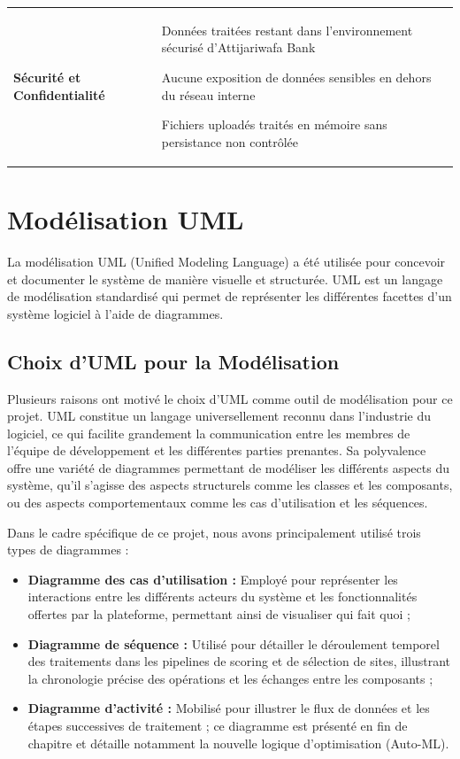 \documentclass[11pt,a4paper,twoside]{report}
\begin{document}
\begin{longtable}{|p{3.2cm}|p{10.8cm}|}
\textbf{Sécurité et Confidentialité} &
\begin{tblitem}
    \item Données traitées restant dans l'environnement sécurisé d'Attijariwafa Bank
    \item Aucune exposition de données sensibles en dehors du réseau interne
    \item Fichiers uploadés traités en mémoire sans persistance non contrôlée
\end{tblitem} \\

\end{longtable}
\endgroup

\section{Modélisation UML}

La modélisation UML (Unified Modeling Language) a été utilisée pour concevoir et documenter le système de manière visuelle et structurée. UML est un langage de modélisation standardisé qui permet de représenter les différentes facettes d'un système logiciel à l'aide de diagrammes.

\subsection{Choix d'UML pour la Modélisation}

Plusieurs raisons ont motivé le choix d'UML comme outil de modélisation pour ce projet. UML constitue un langage universellement reconnu dans l'industrie du logiciel, ce qui facilite grandement la communication entre les membres de l'équipe de développement et les différentes parties prenantes. Sa polyvalence offre une variété de diagrammes permettant de modéliser les différents aspects du système, qu'il s'agisse des aspects structurels comme les classes et les composants, ou des aspects comportementaux comme les cas d'utilisation et les séquences.

Dans le cadre spécifique de ce projet, nous avons principalement utilisé trois types de diagrammes :

\begin{itemize}[leftmargin=1.2cm]
    \item \textbf{Diagramme des cas d'utilisation :} Employé pour représenter les interactions entre les différents acteurs du système et les fonctionnalités offertes par la plateforme, permettant ainsi de visualiser qui fait quoi ;
    
    \item \textbf{Diagramme de séquence :} Utilisé pour détailler le déroulement temporel des traitements dans les pipelines de scoring et de sélection de sites, illustrant la chronologie précise des opérations et les échanges entre les composants ;
    
    \item \textbf{Diagramme d'activité :} Mobilisé pour illustrer le flux de données et les étapes successives de traitement ; ce diagramme est présenté en fin de chapitre et détaille notamment la nouvelle logique d'optimisation (Auto-ML).
\end{itemize}
\end{document}
